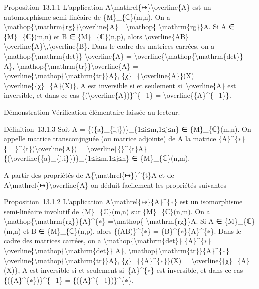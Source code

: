 \documentclass[]{article}
\begin{document}
Proposition~13.1.1 L'application
A\textbackslash{}mathrel\{↦\}\textbackslash{}overline\{A\} est un
automorphisme semi-linéaire de \{M\}\_\{ℂ\}(m,n). On a
\textbackslash{}mathop\{\textbackslash{}mathrm\{rg\}\}\textbackslash{}overline\{A\}
=\textbackslash{}mathop\{ \textbackslash{}mathrm\{rg\}\}A. Si A ∈
\{M\}\_\{ℂ\}(m,n) et B ∈ \{M\}\_\{ℂ\}(n,p), alors
\textbackslash{}overline\{AB\} =
\textbackslash{}overline\{A\}\textbackslash{},\textbackslash{}overline\{B\}.
Dans le cadre des matrices carrées, on a
\textbackslash{}mathop\{\textbackslash{}mathrm\{det\}\}
\textbackslash{}overline\{A\} =
\textbackslash{}overline\{\textbackslash{}mathop\{\textbackslash{}mathrm\{det\}\}
A\},
\textbackslash{}mathop\{\textbackslash{}mathrm\{tr\}\}\textbackslash{}overline\{A\}
=
\textbackslash{}overline\{\textbackslash{}mathop\{\textbackslash{}mathrm\{tr\}\}A\},
\{χ\}\_\{\textbackslash{}overline\{A\}\}(X) =
\textbackslash{}overline\{\{χ\}\_\{A\}(X)\}, A est inversible si et
seulement si~\textbackslash{}overline\{A\} est inversible, et dans ce
cas \{(\textbackslash{}overline\{A\})\}\^{}\{−1\} =
\textbackslash{}overline\{\{A\}\^{}\{−1\}\}.

Démonstration Vérification élémentaire laissée au lecteur.

Définition~13.1.3 Soit A = \{(\{a\}\_\{i,j\})\}\_\{1≤i≤m,1≤j≤n\} ∈
\{M\}\_\{ℂ\}(m,n). On appelle matrice transconjuguée (ou matrice
adjointe) de A la matrice \{A\}\^{}\{∗\} \{=
\}\^{}\{t\}(\textbackslash{}overline\{A\}) =
\textbackslash{}overline\{\{\}\^{}\{t\}A\} =
\{(\textbackslash{}overline\{\{a\}\_\{j,i\}\})\}\_\{1≤i≤m,1≤j≤n\} ∈
\{M\}\_\{ℂ\}(n,m).

A partir des propriétés de A\{\textbackslash{}mathrel\{↦\}\}\^{}\{t\}A
et de A\textbackslash{}mathrel\{↦\}\textbackslash{}overline\{A\} on
déduit facilement les propriétés suivantes

Proposition~13.1.2 L'application
A\textbackslash{}mathrel\{↦\}\{A\}\^{}\{∗\} est un isomorphisme
semi-linéaire involutif de \{M\}\_\{ℂ\}(m,n) sur \{M\}\_\{ℂ\}(n,m). On a
\textbackslash{}mathop\{\textbackslash{}mathrm\{rg\}\}\{A\}\^{}\{∗\}
=\textbackslash{}mathop\{ \textbackslash{}mathrm\{rg\}\}A. Si A ∈
\{M\}\_\{ℂ\}(m,n) et B ∈ \{M\}\_\{ℂ\}(n,p), alors \{(AB)\}\^{}\{∗\} =
\{B\}\^{}\{∗\}\{A\}\^{}\{∗\}. Dans le cadre des matrices carrées, on a
\textbackslash{}mathop\{\textbackslash{}mathrm\{det\}\} \{A\}\^{}\{∗\} =
\textbackslash{}overline\{\textbackslash{}mathop\{\textbackslash{}mathrm\{det\}\}
A\},
\textbackslash{}mathop\{\textbackslash{}mathrm\{tr\}\}\{A\}\^{}\{∗\} =
\textbackslash{}overline\{\textbackslash{}mathop\{\textbackslash{}mathrm\{tr\}\}A\},
\{χ\}\_\{\{A\}\^{}\{∗\}\}(X) =
\textbackslash{}overline\{\{χ\}\_\{A\}(X)\}, A est inversible si et
seulement si~\{A\}\^{}\{∗\} est inversible, et dans ce cas
\{(\{A\}\^{}\{∗\})\}\^{}\{−1\} = \{(\{A\}\^{}\{−1\})\}\^{}\{∗\}.
\end{document}
